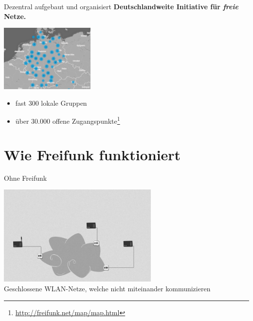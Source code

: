 \documentclass[10pt]{beamer}
\begin{document}
  \begin{frame}{Dezentral aufgebaut und organisiert}
      \large \textbf{Deutschlandweite Initiative für \emph{freie} Netze.}
      \begin{center}
        \includegraphics[height=9em]{images/2016-02-17_map-de}
      \end{center}
      \begin{itemize}
        \item fast 300 lokale Gruppen
        \item über 30.000 offene Zugangspunkte\footnote{\url{http://freifunk.net/map/map.html}}
      \end{itemize}
    \end{frame}
  
  \section{Wie Freifunk funktioniert}
  
  \begin{frame}{Ohne Freifunk}
    \begin{center}
      \includegraphics[height=5cm]{images/network_1}\\
      \vspace{1em}
      Geschlossene WLAN-Netze, welche nicht miteinander kommunizieren
      \vspace{1em}
    \end{center}
  \end{frame}
    
\end{document}
